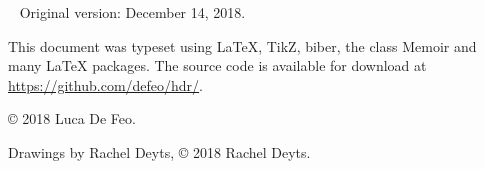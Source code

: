 \begin{titlingpage}
  \clearpage

  ~\vfill
  \footnotesize
  Original version: December 14, 2018.%
  
  \bigskip

  This document was typeset using \LaTeX{}, TikZ, biber, the class
  Memoir and many \LaTeX{} packages. The source code is available for
  download at \url{https://github.com/defeo/hdr/}.

  \bigskip

  \copyright{} 2018 Luca De Feo.
  
  \bigskip

  \ifartwork
  Drawings by Rachel Deyts, \copyright{} 2018 Rachel Deyts.
  \bigskip\fi

  \doclicenseThis
\end{titlingpage}
